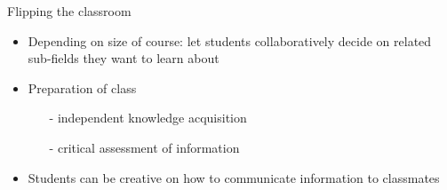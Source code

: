 \begin{frame}{Flipping the classroom}
	\pause
	\begin{itemize}[<+->]
		\item Depending on size of course: let students \alert{collaboratively} decide on related sub-fields they want to learn about
		\item Preparation of class
		\begin{itemize}
			\item[-] independent \alert{knowledge acquisition}
			\item[-] \alert{critical} assessment of information
		\end{itemize}
		\item Students can be \alert{creative} on how to \alert{communicate} information to classmates
		\end{itemize}
\end{frame}



